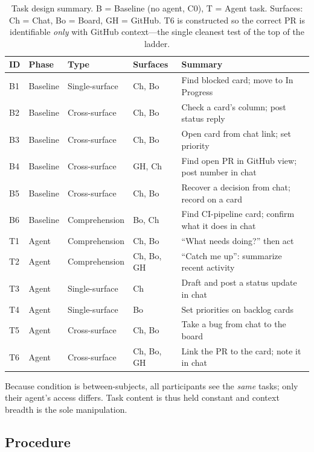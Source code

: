 \begin{table}[h]
  \caption{Task design summary. B = Baseline (no agent, C0), T = Agent task.
    Surfaces: Ch = Chat, Bo = Board, GH = GitHub. T6 is constructed so the
    correct PR is identifiable \emph{only} with GitHub context---the single
    cleanest test of the top of the ladder.}
  \label{tab:tasks}
  \begin{tabular}{lllll}
    \toprule
    ID & Phase & Type & Surfaces & Summary \\
    \midrule
    B1 & Baseline & Single-surface & Ch, Bo     & Find blocked card; move to In Progress \\
    B2 & Baseline & Cross-surface  & Ch, Bo     & Check a card's column; post status reply \\
    B3 & Baseline & Cross-surface  & Ch, Bo     & Open card from chat link; set priority \\
    B4 & Baseline & Cross-surface  & GH, Ch     & Find open PR in GitHub view; post number in chat \\
    B5 & Baseline & Cross-surface  & Ch, Bo     & Recover a decision from chat; record on a card \\
    B6 & Baseline & Comprehension  & Bo, Ch     & Find CI-pipeline card; confirm what it does in chat \\
    \midrule
    T1 & Agent & Comprehension  & Ch, Bo     & ``What needs doing?'' then act \\
    T2 & Agent & Comprehension  & Ch, Bo, GH & ``Catch me up'': summarize recent activity \\
    T3 & Agent & Single-surface & Ch         & Draft and post a status update in chat \\
    T4 & Agent & Single-surface & Bo         & Set priorities on backlog cards \\
    T5 & Agent & Cross-surface  & Ch, Bo     & Take a bug from chat to the board \\
    T6 & Agent & Cross-surface  & Ch, Bo, GH & Link the PR to the card; note it in chat \\
    \bottomrule
  \end{tabular}
\end{table}

Because condition is between-subjects, all participants see the \emph{same}
tasks; only their agent's access differs. Task content is thus held constant and
context breadth is the sole manipulation.

\subsection{Procedure}
\label{sec:study:procedure}

